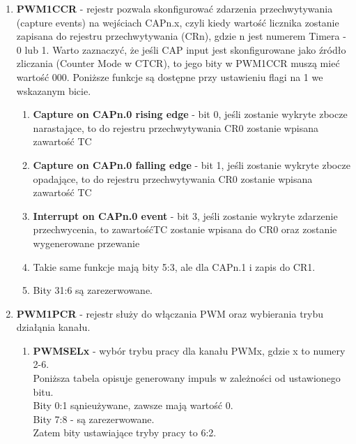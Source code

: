 \begin{enumerate}
\begin{enumerate}
\begin{enumerate}
            \item \textbf{PWM1CCR} - rejestr pozwala skonfigurować zdarzenia przechwytywania (capture events) na wejściach CAPn.x, czyli kiedy wartość licznika zostanie zapisana do rejestru przechwytywania (CRn), gdzie n jest numerem Timera - 0 lub 1. Warto zaznaczyć, że jeśli CAP input jest skonfigurowane jako źródło zliczania (Counter Mode w CTCR), to jego bity w PWM1CCR muszą mieć wartość 000.
                Poniższe funkcje są dostępne przy ustawieniu flagi na 1 we wskazanym bicie.
                \begin{enumerate}
                    \item \textbf{Capture on CAPn.0 rising edge} - bit 0, jeśli zostanie wykryte zbocze narastające, to do rejestru przechwytywania CR0 zostanie wpisana zawartość TC
                    \item \textbf{Capture on CAPn.0 falling edge} - bit 1, jeśli zostanie wykryte zbocze opadające, to do rejestru przechwytywania CR0 zostanie wpisana zawartość TC
                    \item \textbf{Interrupt on CAPn.0 event} - bit 3, jeśli zostanie wykryte zdarzenie przechwycenia, to zawartośćTC zostanie wpisana do CR0 oraz zostanie wygenerowane przewanie
                    \item Takie same funkcje mają bity 5:3, ale dla CAPn.1 i zapis do CR1.
                    \item Bity 31:6 są zarezerwowane.
                \end{enumerate}
            \item \textbf{PWM1PCR} - rejestr służy do włączania PWM oraz wybierania trybu działąnia kanału.
                \begin{enumerate}
                    \item \textbf{PWMSELx} - wybór trybu pracy dla kanału PWMx, gdzie x to numery 2-6.\\
                        Poniższa tabela opisuje generowany impuls w zależności od ustawionego bitu. \\
                        Bity 0:1 sąnieużywane, zawsze mają wartość 0.\\
                        Bity 7:8 - są zarezerwowane.\\
                        Zatem bity ustawiające tryby pracy to 6:2.
                        \begin{table}[H]
                            \centering
                            \begin{tabular}{|c|c|c|}

\end{tabular}
\end{table}
\end{enumerate}
\end{enumerate}
\end{enumerate}
\end{enumerate}
